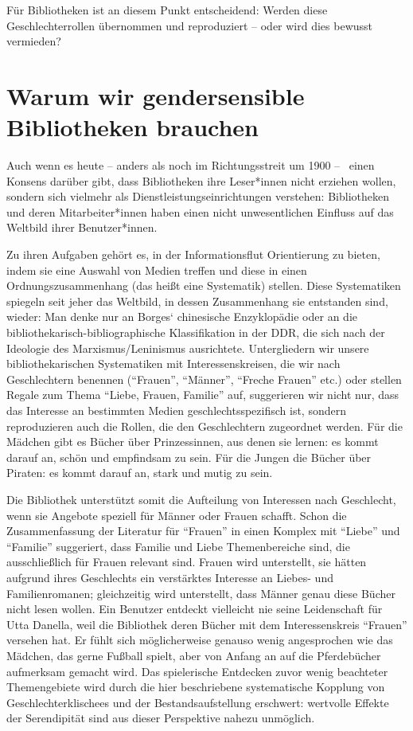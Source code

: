 \documentclass[a4paper,
fontsize=11pt,
oneside,
numbers=noperiodatend,
parskip=half-,
bibliography=totoc,
final
]{scrartcl}
\begin{document}
Für Bibliotheken ist an diesem Punkt entscheidend: Werden diese
Geschlechterrollen über\-nom\-men und reproduziert -- oder wird dies bewusst
vermieden?

\section*{Warum wir gendersensible Bibliotheken
brauchen}\label{warum-wir-gendersensible-bibliotheken-brauchen}

Auch wenn es heute -- anders als noch im Richtungsstreit um 1900 --~
einen Konsens darüber gibt, dass Bibliotheken ihre Leser*innen nicht
erziehen wollen, sondern sich vielmehr als Dienstleistungseinrichtungen
verstehen: Bibliotheken und deren Mitarbeiter*innen haben einen nicht
unwesentlichen Einfluss auf das Weltbild ihrer Benutzer*innen.

Zu ihren Aufgaben gehört es, in der Informationsflut Orientierung zu
bieten, indem sie eine Auswahl von Medien treffen und diese in einen
Ordnungszusammenhang (das heißt eine Systematik) stellen. Diese
Systematiken spiegeln seit jeher das Weltbild, in dessen Zusammenhang
sie entstanden sind, wieder: Man denke nur an Borges` chinesische
Enzyklopädie oder an die bibliothekarisch-bibliographische
Klassifikation in der DDR, die sich nach der Ideologie des
Marxismus/Leninismus ausrichtete. Untergliedern wir unsere
bibliothekarischen Systematiken mit Interessenskreisen, die wir nach
Geschlechtern benennen (\enquote{Frauen}, \enquote{Männer},
\enquote{Freche Frauen} etc.) oder stellen Regale zum Thema
\enquote{Liebe, Frauen, Familie} auf, suggerieren wir nicht nur, dass
das Interesse an bestimmten Medien geschlechtsspezifisch ist, sondern
reproduzieren auch die Rollen, die den Geschlechtern zugeordnet werden.
Für die Mädchen gibt es Bücher über Prinzessinnen, aus denen sie lernen:
es kommt darauf an, schön und empfindsam zu sein. Für die Jungen die
Bücher über Piraten: es kommt darauf an, stark und mutig zu sein.

Die Bibliothek unterstützt somit die Aufteilung von Interessen nach
Geschlecht, wenn sie Angebote speziell für Männer oder Frauen schafft.
Schon die Zusammenfassung der Literatur für \enquote{Frauen} in einen
Komplex mit \enquote{Liebe} und \enquote{Familie} suggeriert, dass
Familie und Liebe Themenbereiche sind, die ausschließlich für Frauen
relevant sind. Frauen wird unterstellt, sie hätten aufgrund ihres
Geschlechts ein verstärktes Interesse an Liebes- und Familienromanen;
gleichzeitig wird unterstellt, dass Männer genau diese Bücher nicht
lesen wollen. Ein Benutzer entdeckt vielleicht nie seine Leidenschaft
für Utta Danella, weil die Bibliothek deren Bücher mit dem
Interessenskreis \enquote{Frauen} versehen hat. Er fühlt sich
möglicherweise genauso wenig angesprochen wie das Mädchen, das gerne
Fußball spielt, aber von Anfang an auf die Pferdebücher aufmerksam
gemacht wird. Das spielerische Entdecken zuvor wenig beachteter
Themengebiete wird durch die hier beschriebene systematische Kopplung
von Geschlechterklischees und der Bestandsaufstellung erschwert:
wertvolle Effekte der Serendipität sind aus dieser Perspektive nahezu
unmöglich.
\end{document}
